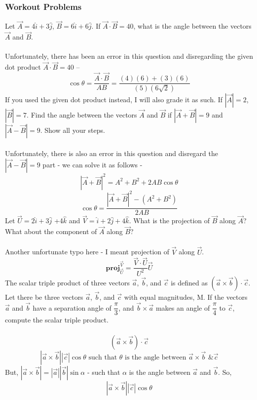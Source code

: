 \documentclass[12pt,addpoints]{exam}
\begin{document}
{{{\begin{questions}
					\subsubsection*{Workout Problems}
					\question Let $\vec{A}=4\hat i+ 3\hat j$, $\vec{B}=6\hat i+ 6\hat j$. If $\vec A\cdot \vec B=40$, what is the angle between the vectors $\vec{A}$ and $\vec{B}$. \\ \\
					Unfortunately, there has been an error in this question and disregarding the given dot product $\vec A\cdot \vec B=40$ --
					$$\cos\theta=\dfrac{\vec A\cdot\vec B}{AB}=\dfrac{(4)(6)+(3)(6)}{(5)(6\sqrt{2})}$$
					If you used the given dot product instead, I will also grade it as such.
					\question If $|\vec{A}|=2$, $|\vec{B}|=7$. Find the angle between the vectors $\vec{A}$ and $\vec{B}$ if $|\vec{A} + \vec{B}|=9$  and $|\vec{A} - \vec{B}|=9$. Show all your steps.\\ \\
					Unfortunately, there is also an error in this question and disregard the $|\vec{A} - \vec{B}|=9$ part - we can solve it as follows -
					$$|\vec A+\vec B|^2=A^2+B^2+2AB\cos\theta$$
					$$\cos\theta=\dfrac{|\vec A+\vec B|^2-(A^2+B^2)}{2AB}$$
					\question Let $\vec{U}=2\hat i+ 3\hat j$ +4$\hat{k}$ and $\vec{V}=\hat i+ 2\hat j+4\hat k$. What is the projection of $\vec{B}$ along $\vec{A}$? What about the component of $\vec{A}$ along $\vec{B}$? \\ \\
					Another unfortunate typo here - I meant projection of $\vec{V}$ along $\vec{U}$.
					$$\textbf{proj}^{\vec{V}}_{\vec{U}}=\dfrac{\vec{V}\cdot\vec{U}}{U^2}\vec{U}$$
					\question The scalar triple product of three vectors $\vec{a}$, $\vec{b}$, and $\vec{c}$ is defined as $(\vec{a} \times \vec{b}) \cdot \vec{c}$. Let there be three vectors $\vec a$, $\vec b$, and $\vec c$ with equal magnitudes, M. If the vectors $\vec{a}$ and $\vec{b}$ have a separation angle of $\dfrac{\pi}{3}$, and $\vec{b}\times\vec{a}$ makes an angle of $\dfrac{\pi}{4}$ to $\vec{c}$, compute the scalar triple product.\\ \\
					$$(\vec{a} \times \vec{b}) \cdot \vec{c}$$
					$$|\vec{a} \times \vec{b}||\vec{c}|\cos\theta \text{ such that }\theta\text{ is the angle between }\vec{a}\times\vec{b}\text{ \& }\vec{c}$$
					But, $|\vec{a}\times\vec{b}|=|\vec{a}||\vec{b}|\sin\alpha$ - such that $\alpha$ is the angle between $\vec{a}$ and $\vec{b}$. So, 
					$$|\vec{a} \times \vec{b}||\vec{c}|\cos\theta$$	

\end{questions}}}}
\end{document}
